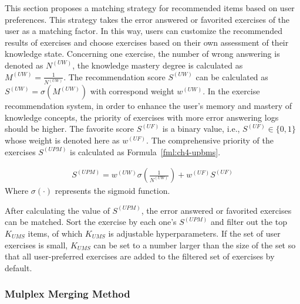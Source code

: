 
This section proposes a matching strategy for recommended items based on user preferences. This strategy takes the error answered or favorited exercises of the user as a matching factor. In this way, users can customize the recommended results of exercises and choose exercises based on their own assessment of their knowledge state. Concerning one exercise, the number of wrong answering is denoted as \(N^{(UW)}\), the knowledge mastery degree is calculated as \(M^{(UW)}=\frac{1}{N^{(UW)}}\). The recommendation score \(S^{(UW)}\) can be calculated as \(S^{(UW)}=\sigma(M^{(UW)}) \)  with correspond weight \(w^{(UW)}\). In the exercise recommendation system, in order to enhance the user's memory and mastery of knowledge concepts, the priority of exercises with more error answering logs should be higher. The favorite score \(S^{(UF)}\) is a binary value, i.e., \(S^{(UF)}\in \{0,1\} \) whose weight is denoted here as \(w^{(UF)}\). The comprehensive priority of the exercises \(S^{(UPM)}\) is calculated as Formula~\ref{fml:ch4-upbms}.

\begin{align}
  S^{(UPM)} = w^{(UW)}\sigma({\frac{1}{N^{(UW)}}}) + w^{(UF)}S^{(UF)} \label{fml:ch4-upbms}
\end{align}
Where \(\sigma(\cdot)\) represents the sigmoid function.

After calculating the value of \(S^{(UPM)}\), the error answered or favorited exercises can be matched. Sort the exercise by each one's \(S^{(UPM)}\) and filter out the top \(K_{UMS}\) items, of which \(K_{UMS}\) is adjustable hyperparameters. If the set of user exercises is small, \(K_{UMS}\) can be set to a number larger than the size of the set so that all user-preferred exercises are added to the filtered set of exercises by default.

\subsubsection{Mulplex Merging Method}

